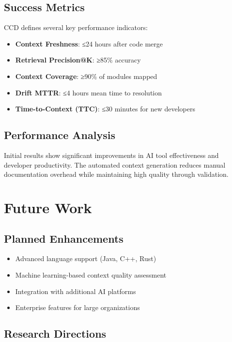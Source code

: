 \documentclass[11pt,a4paper]{article}
\begin{document}
\subsection{Success Metrics}

CCD defines several key performance indicators:

\begin{itemize}
    \item \textbf{Context Freshness}: ≤24 hours after code merge
    \item \textbf{Retrieval Precision@K}: ≥85\% accuracy
    \item \textbf{Context Coverage}: ≥90\% of modules mapped
    \item \textbf{Drift MTTR}: ≤4 hours mean time to resolution
    \item \textbf{Time-to-Context (TTC)}: ≤30 minutes for new developers
\end{itemize}

\subsection{Performance Analysis}

Initial results show significant improvements in AI tool effectiveness and developer productivity. The automated context generation reduces manual documentation overhead while maintaining high quality through validation.

\section{Future Work}

\subsection{Planned Enhancements}

\begin{itemize}
    \item Advanced language support (Java, C++, Rust)
    \item Machine learning-based context quality assessment
    \item Integration with additional AI platforms
    \item Enterprise features for large organizations
\end{itemize}

\subsection{Research Directions}
\end{document}
